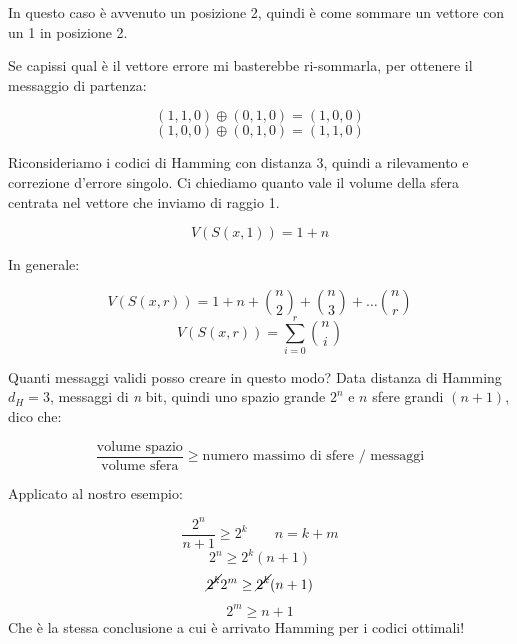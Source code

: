 In questo caso è avvenuto un posizione 2, quindi è come sommare un vettore con un 1 in posizione 2.

Se capissi qual è il vettore errore mi basterebbe ri-sommarla, per ottenere il messaggio di partenza:

\begin{equation*}
(1,1,0) \oplus (0,1,0) = (1,0,0)
\end{equation*}
\begin{equation*}
(1,0,0) \oplus (0,1,0) = (1,1,0)
\end{equation*}

Riconsideriamo i codici di Hamming con distanza 3, quindi a rilevamento e correzione d'errore singolo.
Ci chiediamo quanto vale il volume della sfera centrata nel vettore che inviamo di raggio 1.

\begin{equation}
V(S(x,1))=1+n
\end{equation}

In generale:

\begin{equation*}
V(S(x,r))=1+n+\binom{n}{2} + \binom{n}{3} + \dots \binom{n}{r}
\end{equation*}
\begin{equation}
V(S(x,r))= \sum_{i=0}^r \binom{n}{i}
\end{equation}

Quanti messaggi validi posso creare in questo modo?
Data distanza di Hamming $d_H=3$, messaggi di \textit{n} bit, quindi uno spazio grande $2^n$ e $n$ sfere grandi $(n+1)$, dico che:

\begin{equation}
\frac{\text{volume spazio}}{\text{volume sfera}} \geq \text{numero massimo di sfere / messaggi}
\end{equation}

\newpage

Applicato al nostro esempio:

\begin{equation*}
\frac{2^n}{n+1} \geq 2^k \; \; \; \; \; \; \; n = k + m
\end{equation*}
\begin{equation*}
2^n \geq 2^k(n+1)
\end{equation*}
\begin{equation*}
\cancel{2^k} 2^m \geq \cancel{2^k}(n+1)
\end{equation*}
\begin{equation*}
2^m \geq n+1
\end{equation*}
Che è la stessa conclusione a cui è arrivato Hamming per i codici ottimali!

